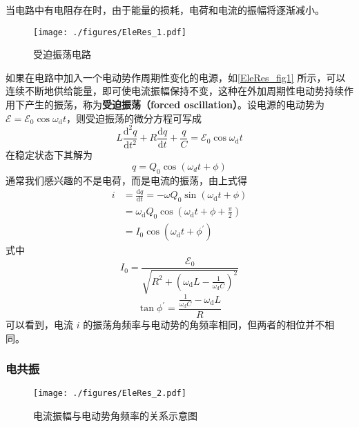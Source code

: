 

当电路中有电阻存在时，由于能量的损耗，电荷和电流的振幅将逐渐减小。
\begin{figure}[ht]
\centering
\texttt{[image: ./figures/EleRes\_1.pdf]}
\caption{受迫振荡电路} \label{EleRes_fig1}
\end{figure}
如果在电路中加入一个电动势作周期性变化的电源，如\autoref{EleRes_fig1} 所示，可以连续不断地供给能量，即可使电流振幅保持不变，这种在外加周期性电动势持续作用下产生的振荡，称为\textbf{受迫振荡（forced oscillation）}。设电源的电动势为 $\mathscr{E}=\mathscr{E}_{0} \cos \omega_{\mathrm{d}} t$，则受迫振荡的微分方程可写成
\begin{equation}
L \frac{\mathrm{d}^{2} q}{\mathrm{d} t^{2}}+R \frac{\mathrm{d} q}{\mathrm{d} t}+\frac{q}{C}=\mathscr{E}_{0} \cos \omega_{\mathrm{d}} t
\end{equation}
在稳定状态下其解为
\begin{equation}
q=Q_{0} \cos \left(\omega_{d} t+\phi\right)
\end{equation}
通常我们感兴趣的不是电荷，而是电流的振荡，由上式得
\begin{equation}
\begin{aligned}i&=\frac{\mathrm{d} q}{\mathrm{d} t}=-\omega Q_{0} \sin \left(\omega_{\mathrm{d}} t+\phi\right) \\ &=\omega_{\mathrm{d}} Q_{0} \cos \left(\omega_{\mathrm{d}} t+\phi+\frac{\pi}{2}\right) \\ &=I_{0} \cos \left(\omega_{\mathrm{d}} t+\phi^{\prime}\right)\end{aligned}
\end{equation}
式中
\begin{equation} \label{EleRes_eq1}
I_{0}=\frac{\mathscr{E}_{0}}{\sqrt{R^{2}+\left(\omega_{\mathrm{d}} L-\frac{1}{\omega_{\mathrm{d}} C}\right)^{2}}}
\end{equation}
\begin{equation} \label{EleRes_eq2}
\tan \phi^{\prime}=\frac{\frac{1}{\omega_{\mathrm{d}} C}-\omega_{\mathrm{d}} L}{R}
\end{equation}
可以看到，电流 $i$ 的振荡角频率与电动势的角频率相同，但两者的相位并不相同。

\subsubsection{电共振}
\begin{figure}[ht]
\centering
\texttt{[image: ./figures/EleRes\_2.pdf]}
\caption{电流振幅与电动势角频率的关系示意图} \label{EleRes_fig2}
\end{figure}

